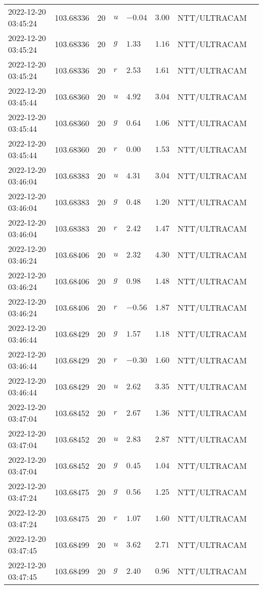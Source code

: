 \documentclass{nature_plusfigure}
\begin{document}
\begin{supplement}
\begin{center}
\begin{longtable}{llllllll}
2022-12-20 03:45:24 & 103.68336 & 20 & $u$ & $-0.04$ & $3.00$ & NTT/ULTRACAM &  \\ 
2022-12-20 03:45:24 & 103.68336 & 20 & $g$ & $1.33$ & $1.16$ & NTT/ULTRACAM &  \\ 
2022-12-20 03:45:24 & 103.68336 & 20 & $r$ & $2.53$ & $1.61$ & NTT/ULTRACAM &  \\ 
2022-12-20 03:45:44 & 103.68360 & 20 & $u$ & $4.92$ & $3.04$ & NTT/ULTRACAM &  \\ 
2022-12-20 03:45:44 & 103.68360 & 20 & $g$ & $0.64$ & $1.06$ & NTT/ULTRACAM &  \\ 
2022-12-20 03:45:44 & 103.68360 & 20 & $r$ & $0.00$ & $1.53$ & NTT/ULTRACAM &  \\ 
2022-12-20 03:46:04 & 103.68383 & 20 & $u$ & $4.31$ & $3.04$ & NTT/ULTRACAM &  \\ 
2022-12-20 03:46:04 & 103.68383 & 20 & $g$ & $0.48$ & $1.20$ & NTT/ULTRACAM &  \\ 
2022-12-20 03:46:04 & 103.68383 & 20 & $r$ & $2.42$ & $1.47$ & NTT/ULTRACAM &  \\ 
2022-12-20 03:46:24 & 103.68406 & 20 & $u$ & $2.32$ & $4.30$ & NTT/ULTRACAM &  \\ 
2022-12-20 03:46:24 & 103.68406 & 20 & $g$ & $0.98$ & $1.48$ & NTT/ULTRACAM &  \\ 
2022-12-20 03:46:24 & 103.68406 & 20 & $r$ & $-0.56$ & $1.87$ & NTT/ULTRACAM &  \\ 
2022-12-20 03:46:44 & 103.68429 & 20 & $g$ & $1.57$ & $1.18$ & NTT/ULTRACAM &  \\ 
2022-12-20 03:46:44 & 103.68429 & 20 & $r$ & $-0.30$ & $1.60$ & NTT/ULTRACAM &  \\ 
2022-12-20 03:46:44 & 103.68429 & 20 & $u$ & $2.62$ & $3.35$ & NTT/ULTRACAM &  \\ 
2022-12-20 03:47:04 & 103.68452 & 20 & $r$ & $2.67$ & $1.36$ & NTT/ULTRACAM &  \\ 
2022-12-20 03:47:04 & 103.68452 & 20 & $u$ & $2.83$ & $2.87$ & NTT/ULTRACAM &  \\ 
2022-12-20 03:47:04 & 103.68452 & 20 & $g$ & $0.45$ & $1.04$ & NTT/ULTRACAM &  \\ 
2022-12-20 03:47:24 & 103.68475 & 20 & $g$ & $0.56$ & $1.25$ & NTT/ULTRACAM &  \\ 
2022-12-20 03:47:24 & 103.68475 & 20 & $r$ & $1.07$ & $1.60$ & NTT/ULTRACAM &  \\ 
2022-12-20 03:47:45 & 103.68499 & 20 & $u$ & $3.62$ & $2.71$ & NTT/ULTRACAM &  \\ 
2022-12-20 03:47:45 & 103.68499 & 20 & $g$ & $2.40$ & $0.96$ & NTT/ULTRACAM &  \\ 

\end{longtable}
\end{center}
\end{supplement}
\end{document}
